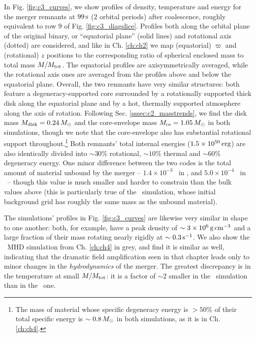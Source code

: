 In Fig. \ref{fig:c3_curves}, we show profiles of density, temperature and energy for the merger remnants at $99\,\mathrm{s}$ ($2$ orbital periods) after coalescence, roughly equivalent to row $9$ of Fig. \ref{fig:c3_diagslice}.  Profiles both along the orbital plane of the original binary, or ``equatorial plane'' (solid lines) and rotational axis (dotted) are considered, and like in Ch. \ref{ch:ch2} we map (equatorial) $\varpi$ and (rotational) $z$ positions to the corresponding ratio of spherical enclosed mass to total mass $M/M_{\rm tot}$.  The equatorial profiles are axisymmetrically averaged, while the rotational axis ones are averaged from the profiles above and below the equatorial plane.  Overall, the two remnants have very similar structures: both feature a degeneracy-supported core surrounded by a rotationally supported thick disk along the equatorial plane and by a hot, thermally supported atmosphere along the axis of rotation.  Following Sec. \ref{sssec:c2_masstrends}, we find the disk mass $\Mdisk = 0.24\,\Msun$ and the core-envelope mass $\Mrem = 1.05\,\Msun$ in both simulations, though we note that the core-envelope also has substantial rotational support throughout.\footnote{The mass of material whose specific degeneracy energy is $>50$\% of their total specific energy is $\sim0.8\,\Msun$ in both simulations, as it is in Ch. \ref{ch:ch4}.}  Both remnants' total internal energies ($1.5\times10^{50}\,\mathrm{erg}$) are also identically divided into $\sim30$\% rotational, $\sim10$\% thermal and $\sim60$\% degeneracy energy.  One minor difference between the two codes is the total amount of material unbound by the merger -- $1.4\times10^{-3}$ \Msun\ in \gasoline, and $5.0\times10^{-4}$ \Msun\ in \arepo\ -- though this value is much smaller and harder to constrain than the bulk values above (this is particularly true of the \arepo\ simulation, whose initial background grid has roughly the same mass as the unbound material).



The simulations' profiles in Fig. \ref{fig:c3_curves} are likewise very similar in shape to one another: both, for example, have a peak density of $\sim3\times10^6\,\gcc$ and a large fraction of their mass rotating nearly rigidly at $\sim0.3\,\psec$.  We also show the \arepo\ MHD simulation from Ch. \ref{ch:ch4} in grey, and find it is similar as well, indicating that the dramatic field amplification seen in that chapter leads only to minor changes in the \textit{hydrodynamics} of the merger.  The greatest discrepancy is in the temperature at small $M/M_{\rm tot}$: it is a factor of $\sim2$ smaller in the \arepo\ simulation than in the \gasoline\ one.

